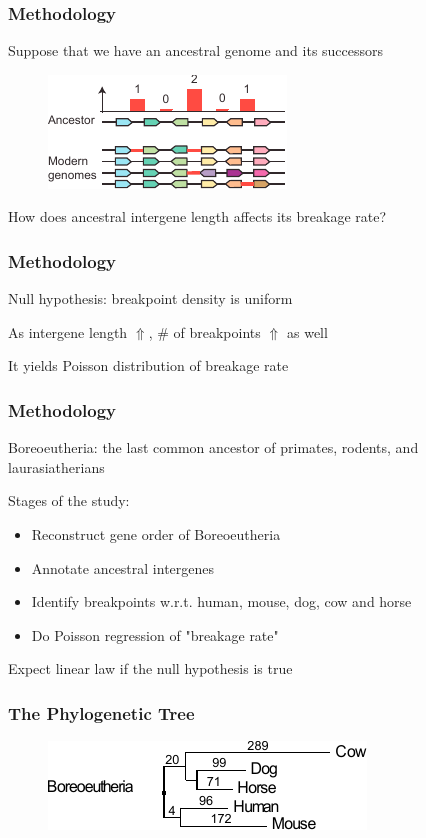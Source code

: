 \documentclass[svgnames,14pt]{beamer}
\begin{document}
\begin{frame}
\frametitle{Methodology}
Suppose that we have an ancestral genome and its successors
\begin{figure}
	\centering
	\includegraphics[scale = 2.20]{Ancestor.pdf}
\end{figure}

How does ancestral intergene length affects its breakage rate?
\end{frame}

\begin{frame}
\frametitle{Methodology}
Null hypothesis: breakpoint density is uniform

\vspace{12pt}
As intergene length $\Uparrow$, \# of breakpoints $\Uparrow$ as well

\vspace{12pt}
It yields Poisson distribution of breakage rate
\end{frame}

\begin{frame}
\frametitle{Methodology}
Boreoeutheria: the last common ancestor of primates, rodents, and laurasiatherians

\vspace{12pt}
Stages of the study:
\begin{itemize}
\item Reconstruct gene order of Boreoeutheria
\item Annotate ancestral intergenes
\item Identify breakpoints w.r.t. human, mouse, dog, cow and horse
\item Do Poisson regression of "breakage rate" 
\end{itemize}

\vspace{12pt}
Expect linear law if the null hypothesis is true
\end{frame}

\begin{frame}
\frametitle{The Phylogenetic Tree}
\begin{figure}
	\centering
	\includegraphics[scale = 2.0]{BreakCount.pdf}
\end{figure}
\end{frame}
\end{document}

